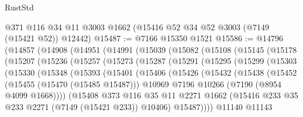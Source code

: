 \begin{lexlean}{RustStd}
\begin{coremodule}
    @371
    @116
    @34
    @11
    @3003
    @1662
    (@15416 @52 @34 @52 @3003 (@7149 (@15421 @52)) @12442)
@15487 := @7166 @15350 @1521
@15586 := @14796
    (@14857
      (@14908
        (@14951
          (@14991
            (@15039
              (@15082
                (@15108
                  (@15145
                    (@15178
                      (@15207
                        (@15236
                          (@15257
                            (@15273
                              (@15287
                                (@15291
                                  (@15295
                                    (@15299
                                      (@15303
                                        (@15330
                                          (@15348
                                            (@15393
                                              (@15401
                                                (@15406
                                                  (@15426
                                                    (@15432
                                                      (@15438
                                                        (@15452
                                                          (@15455 (@15470 (@15485 @15487)))
                                                          @10969
                                                          @7196
                                                          @10266
                                                          (@7190 (@8954 @4099 @1668))))
                                                      (@15408
                                                        @373
                                                        @116
                                                        @35
                                                        @11
                                                        @2271
                                                        @1662
                                                        (@15416
                                                          @233
                                                          @35
                                                          @233
                                                          @2271
                                                          (@7149 (@15421 @233))
                                                          @10406)
                                                        @15487))))
                                                @11140
                                                @11143

\end{coremodule}
\end{lexlean}
